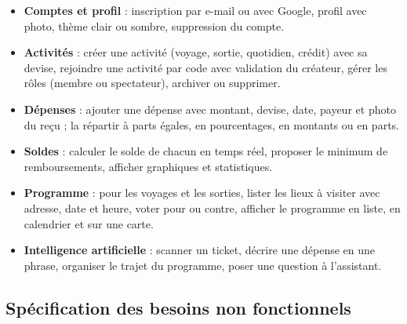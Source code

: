 \begin{itemize}
  \item \textbf{Comptes et profil} : inscription par e-mail ou avec Google, profil avec photo,
        thème clair ou sombre, suppression du compte.
  \item \textbf{Activités} : créer une activité (voyage, sortie, quotidien, crédit) avec sa
        devise, rejoindre une activité par code avec validation du créateur, gérer les rôles
        (membre ou spectateur), archiver ou supprimer.
  \item \textbf{Dépenses} : ajouter une dépense avec montant, devise, date, payeur et photo du
        reçu ; la répartir à parts égales, en pourcentages, en montants ou en parts.
  \item \textbf{Soldes} : calculer le solde de chacun en temps réel, proposer le minimum de
        remboursements, afficher graphiques et statistiques.
  \item \textbf{Programme} : pour les voyages et les sorties, lister les lieux à visiter avec
        adresse, date et heure, voter pour ou contre, afficher le programme en liste, en
        calendrier et sur une carte.
  \item \textbf{Intelligence artificielle} : scanner un ticket, décrire une dépense en une
        phrase, organiser le trajet du programme, poser une question à l'assistant.
\end{itemize}

\subsection{Spécification des besoins non fonctionnels}

